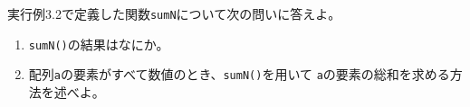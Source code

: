  \begin{Prob}\upshape\Must
  実行例3.2で定義した関数\texttt{sumN}について次の問いに答えよ。
  \begin{enumerate}
   \item \texttt{sumN()}の結果はなにか。
         \ifText\\[0.03\textheight]\fi
   \item 配列\texttt{a}の要素がすべて数値のとき、\texttt{sumN()}を用いて
         \texttt{a}の要素の総和を求める方法を述べよ。
         \ifText\\[0.03\textheight]\fi
  \end{enumerate}
\end{Prob}
